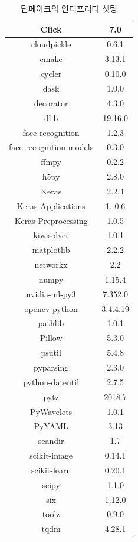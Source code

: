 \documentclass{oblivoir}
\begin{document}
\begin{table}[h!]
\centering
\begin{tabular}{|c|c|}
    \hline\hline
    Click & 7.0 \\ \hline
    cloudpickle & 0.6.1 \\ \hline
    cmake & 3.13.1 \\ \hline
    cycler& 0.10.0 \\ \hline
    dask & 1.0.0 \\ \hline
    decorator & 4.3.0 \\ \hline
    dlib & 19.16.0 \\ \hline
    face-recognition &  1.2.3 \\ \hline
    face-recognition-models & 0.3.0 \\ \hline
    ffmpy & 0.2.2 \\ \hline
    h5py & 2.8.0 \\ \hline
    Keras & 2.2.4 \\ \hline
    Keras-Applications & 1. 0.6 \\ \hline
    Keras-Preprocessing & 1.0.5 \\ \hline
    kiwisolver & 1.0.1 \\ \hline
    matplotlib & 2.2.2 \\ \hline
    networkx &  2.2 \\ \hline
    numpy & 1.15.4 \\ \hline
    nvidia-ml-py3 & 7.352.0 \\ \hline
    opencv-python & 3.4.4.19 \\ \hline
    pathlib & 1.0.1 \\ \hline
    Pillow & 5.3.0 \\ \hline
    psutil & 5.4.8 \\ \hline
    pyparsing & 2.3.0 \\ \hline
    python-dateutil & 2.7.5 \\ \hline
    pytz & 2018.7 \\ \hline
    PyWavelets &  1.0.1 \\ \hline
    PyYAML &  3.13 \\ \hline
    scandir & 1.7 \\ \hline
    scikit-image & 0.14.1 \\ \hline
    scikit-learn & 0.20.1 \\ \hline
    scipy & 1.1.0 \\ \hline
    six & 1.12.0 \\ \hline
    toolz  & 0.9.0 \\ \hline
    tqdm & 4.28.1 \\ \hline
    \hline\hline
\end{tabular}
\caption{딥페이크의 인터프리터 셋팅 }
\end{table}
\end{document}
